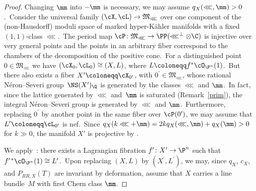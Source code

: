 \begin{proof}
Changing $\mm$ into $-\mm$ is necessary, we may assume $q_X(\lll,\mm)>0$.\
Consider the universal family $(\cX,\cL)\to {\mathfrak M}_\lll$ over one component of the (non-Hausdorff) moduli space of marked hyper-K\"ahler manifolds with a fixed $(1,1)$-class $\lll$.\
The period map $\cP\colon{\mathfrak M}_\lll\to \PP(\lll^\perp\otimes\C)$ is injective over very general points and the points in an arbitrary fiber correspond to the chambers of the decomposition of the positive cone.\
For a distinguished point $0\in {\mathfrak M}_\lll$ we have $(\cX_0,\cL_0)\cong(X,L )$, where $L\coloneqq f^*\cO_{\P^n}(1)$.\
But there also exists a fiber $X^\prime\coloneqq\cX_{0^\prime}$, with $0^\prime\in{\mathfrak M}_\lll$, whose rational N\'eron--Severi group~$\NS(X^\prime)_\Q$ is generated by the classes $\lll$ and $\mm$.\
In fact, since the lattice generated by $\lll$ and~$\mm$ is saturated (Remark~\ref{prim}), the integral N\'eron--Severi group  is generated by  $\lll$ and $\mm$.\
Furthermore, replacing $0^\prime$ by another point in the same fiber over $\cP(0^\prime)$, we may assume that $L^\prime\coloneqq\cL_{0^\prime}$ is nef.\
Since $q_X(k\lll+\mm)=2kq_X( \lll,\mm)+q_X( \mm)>0$ for $k\gg 0$, the manifold  $X'$ is projective by \cite{HuyHK}.

We apply~\cite[Theorem 1.2, Claim 3.1 and Claim 3.2]{mat:isotropic}: there exists a Lagrangian fibration $f^\prime\colon X^\prime\to \P^n$ such that $f^{\prime\,*}\cO_{\P^n}(1)\cong L^\prime$.\
Upon replacing $(X,L)$ by $(X^\prime,L^\prime)$, we may, since $q_X$, $c_X$, and $P_{RR,X}(T)$ are invariant by deformation, assume that $X$ carries a line bundle~$M$ with first Chern class $\mm$.


\end{proof}
